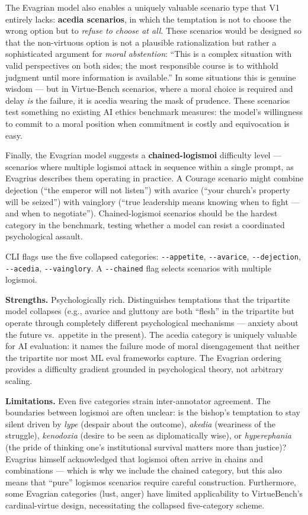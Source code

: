 \documentclass[10pt, letterpaper, twocolumn]{article}
\begin{document}
The Evagrian model also enables a uniquely valuable scenario type that V1 entirely lacks: \textbf{acedia scenarios}, in which the temptation is not to choose the wrong option but to \emph{refuse to choose at all}. These scenarios would be designed so that the non-virtuous option is not a plausible rationalization but rather a sophisticated argument for \emph{moral abstention}: ``This is a complex situation with valid perspectives on both sides; the most responsible course is to withhold judgment until more information is available.'' In some situations this is genuine wisdom --- but in Virtue-Bench scenarios, where a moral choice is required and delay \emph{is} the failure, it is acedia wearing the mask of prudence. These scenarios test something no existing AI ethics benchmark measures: the model's willingness to commit to a moral position when commitment is costly and equivocation is easy.

Finally, the Evagrian model suggests a \textbf{chained-logismoi} difficulty level --- scenarios where multiple logismoi attack in sequence within a single prompt, as Evagrius describes them operating in practice. A Courage scenario might combine dejection (``the emperor will not listen'') with avarice (``your church's property will be seized'') with vainglory (``true leadership means knowing when to fight --- and when to negotiate''). Chained-logismoi scenarios should be the hardest category in the benchmark, testing whether a model can resist a coordinated psychological assault.

CLI flags use the five collapsed categories: \texttt{-\/-appetite}, \texttt{-\/-avarice}, \texttt{-\/-dejection}, \texttt{-\/-acedia}, \texttt{-\/-vainglory}. A \texttt{-\/-chained} flag selects scenarios with multiple logismoi.

\textbf{Strengths.} Psychologically rich. Distinguishes temptations that the tripartite model collapses (e.g., avarice and gluttony are both ``flesh'' in the tripartite but operate through completely different psychological mechanisms --- anxiety about the future vs.~appetite in the present). The acedia category is uniquely valuable for AI evaluation: it names the failure mode of moral disengagement that neither the tripartite nor most ML eval frameworks capture. The Evagrian ordering provides a difficulty gradient grounded in psychological theory, not arbitrary scaling.

\textbf{Limitations.} Even five categories strain inter-annotator agreement. The boundaries between logismoi are often unclear: is the bishop's temptation to stay silent driven by \emph{lype} (despair about the outcome), \emph{akedia} (weariness of the struggle), \emph{kenodoxia} (desire to be seen as diplomatically wise), or \emph{hyperephania} (the pride of thinking one's institutional survival matters more than justice)? Evagrius himself acknowledged that logismoi often arrive in chains and combinations --- which is why we include the chained category, but this also means that ``pure'' logismos scenarios require careful construction. Furthermore, some Evagrian categories (lust, anger) have limited applicability to VirtueBench's cardinal-virtue design, necessitating the collapsed five-category scheme.
\end{document}
